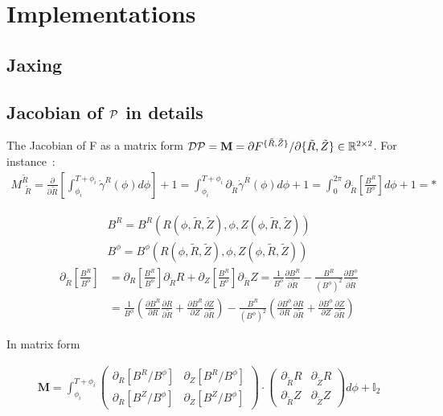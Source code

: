 \chapter{Implementations}

\section{Jaxing}\label{sec:jaxpot}

\section{Jacobian of $\mathcal{P}$ in details}
The Jacobian of F as a matrix form $\mathcal{D}\mathcal{P} = \textbf{M} = \partial F^{\{\tilde{R},\tilde{Z}\}}/{\partial \{\tilde{R},\tilde{Z}\}} \in \mathbb{R}^{2\times2}$. For instance~:
\begin{align*}
    M^{\tilde{R}}_{\,\:\tilde{R}} = \frac{\partial}{\partial \tilde{R}}\left[\int_{\phi_i}^{T+\phi_i}\dot{\gamma}^R(\phi)d\phi\right] + 1 = \int_{\phi_i}^{T+\phi_i}\partial_{\tilde{R}}\dot{\gamma}^R(\phi)d\phi + 1 = \int_0^{2\pi}\partial_{\tilde{R}}\left[\frac{B^R}{B^\phi}\right]d\phi + 1 = *
\end{align*}

\begin{align*}
  B^R = B^R(R(\phi, \tilde{R}, \tilde{Z}), \phi, Z(\phi, \tilde{R}, \tilde{Z}))\\
    B^\phi = B^\phi(R(\phi, \tilde{R}, \tilde{Z}), \phi, Z(\phi, \tilde{R}, \tilde{Z}))
\end{align*}
\begin{align*}
    \partial_{\tilde{R}}\left[\frac{B^R}{B^\phi}\right] &= \partial_{R}\left[\frac{B^R}{B^\phi}\right]\partial_{\tilde{R}}R + \partial_{Z}\left[\frac{B^R}{B^\phi}\right]\partial_{\tilde{R}}Z = \frac{1}{B^\phi}\frac{\partial B^R}{\partial\tilde{R}} - \frac{B^R}{(B^\phi)^2}\frac{\partial B^\phi}{\partial\tilde{R}} \\&= \frac{1}{B^\phi}\left(\frac{\partial B^R}{\partial R}\frac{\partial R}{\partial\tilde{R}}+\frac{\partial B^R}{\partial Z}\frac{\partial Z}{\partial\tilde{R}}\right) - \frac{B^R}{(B^\phi)^2}\left(\frac{\partial B^\phi}{\partial R}\frac{\partial R}{\partial\tilde{R}}+\frac{\partial B^\phi}{\partial Z}\frac{\partial Z}{\partial\tilde{R}}\right)
\end{align*}

In matrix form

\begin{align}
    \textbf{M} = \int_{\phi_i}^{T+\phi_i}\begin{pmatrix}
        \partial_{R}\left[B^R/B^\phi\right] & \partial_{Z}\left[B^R/B^\phi\right]\\
        \partial_{R}\left[B^Z/B^\phi\right] & \partial_{Z}\left[B^Z/B^\phi\right]
    \end{pmatrix}\cdot\begin{pmatrix}
        \partial_{\tilde{R}}R & \partial_{\tilde{Z}}R\\
        \partial_{\tilde{R}}Z & \partial_{\tilde{Z}}Z
    \end{pmatrix}d\phi + \mathbb{I}_2
\end{align}

